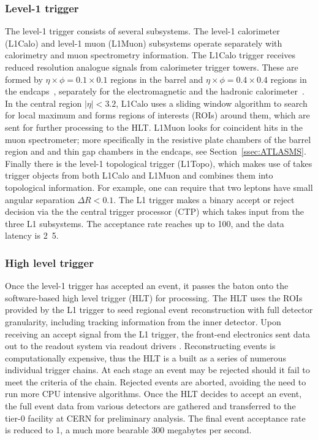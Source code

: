 \subsubsection{Level-1 trigger}

The level-1 trigger consists of several subsystems. The level-1 calorimeter (L1Calo) and level-1 muon (L1Muon) subsystems operate separately with calorimetry and muon spectrometry information. The L1Calo trigger receives reduced resolution analogue signals from calorimeter trigger towers. These are formed by $\eta\times\phi=0.1\times0.1$ regions in the barrel and $\eta\times\phi=0.4\times0.4$ regions in the endcaps~\cite{pdg_2021}, separately for the electromagnetic and the hadronic calorimeter~\cite{Aad:2716326}. In the central region $|\eta| < 3.2$, L1Calo uses a sliding window algorithm to search for local maximum and forms regions of interests (ROIs) around them, which are sent for further processing to the HLT. L1Muon looks for coincident hits in the muon spectrometer; more specifically in the resistive plate chambers of the barrel region and and thin gap chambers in the endcaps, see Section~\ref{ssec:ATLASMS}. Finally there is the level-1 topological trigger (L1Topo), which makes use of takes trigger objects from both L1Calo and L1Muon and combines them into topological information. For example, one can require that two leptons have small angular separation $\Delta R < 0.1$. The L1 trigger makes a binary accept or reject decision via the the central trigger processor (CTP) which takes input from the three L1 subsystems. The acceptance rate reaches up to \unit{100}{\kilo\hertz}, and the data latency is \unit{2.5}{\micro\second}. 

\subsubsection{High level trigger}

Once the level-1 trigger has accepted an event, it passes the baton onto the software-based high level trigger (HLT) for processing. The HLT uses the ROIs provided by the L1 trigger to seed regional event reconstruction with full detector granularity, including tracking information from the inner detector. Upon receiving an accept signal from the L1 trigger, the front-end electronics sent data out to the readout system via readout drivers . Reconstructing events is computationally expensive, thus the HLT is a built as a series of numerous individual trigger chains. At each stage an event may be rejected should it fail to meet the criteria of the chain. Rejected events are aborted, avoiding the need to run more CPU intensive algorithms. Once the HLT decides to accept an event, the full event data from various detectors are gathered and transferred to the tier-0 facility at CERN for preliminary analysis. The final event acceptance rate is reduced to \unit{1}{\kilo\hertz}, a much more bearable 300 megabytes per second. 

